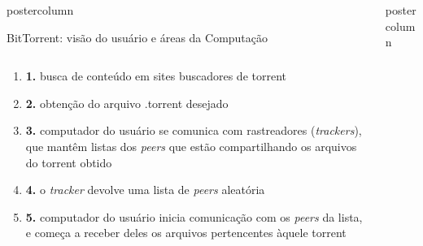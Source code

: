 \documentclass[final,brazil]{beamer}
\newlength{\columnheight}
\begin{document}
\begin{frame}
\begin{columns}
\begin{column}{.245\textwidth}
\begin{beamercolorbox}[center,wd=\textwidth]{postercolumn}
\begin{minipage}[T]{.95\textwidth}
{\begin{block}{BitTorrent: visão do usuário e áreas da Computação}
              \begin{columns}
                \hspace{-6ex}
                \begin{column}{.97\textwidth}
                  \begin{enumerate}
                    \justifying
                    \item \textbf{1.} busca de conteúdo em sites buscadores de torrent
                    \item \textbf{2.} obtenção do arquivo .torrent desejado
                    \item \textbf{3.} computador do usuário se comunica com rastreadores
                      (\emph{trackers}), que mantêm listas dos \emph{peers} que estão
                      compartilhando os arquivos do torrent obtido
                    \item \textbf{4.} o \emph{tracker} devolve uma lista de \emph{peers}
                      aleatória
                    \item \textbf{5.} computador do usuário inicia comunicação com os
                      \emph{peers} da lista, e começa a receber deles os arquivos
                      pertencentes àquele torrent
                  \end{enumerate}
                \end{column}
              \end{columns}
            \end{block}
          }
        \end{minipage}
      \end{beamercolorbox}
    \end{column}

    \begin{column}{.49\textwidth}
      \begin{beamercolorbox}[center,wd=\textwidth]{postercolumn}
        \begin{minipage}[T]{.95\textwidth}  %
          \parbox[t][\columnheight]{\textwidth}{ %

}
\end{minipage}
\end{beamercolorbox}
\end{column}
\end{columns}
\end{frame}
\end{document}
